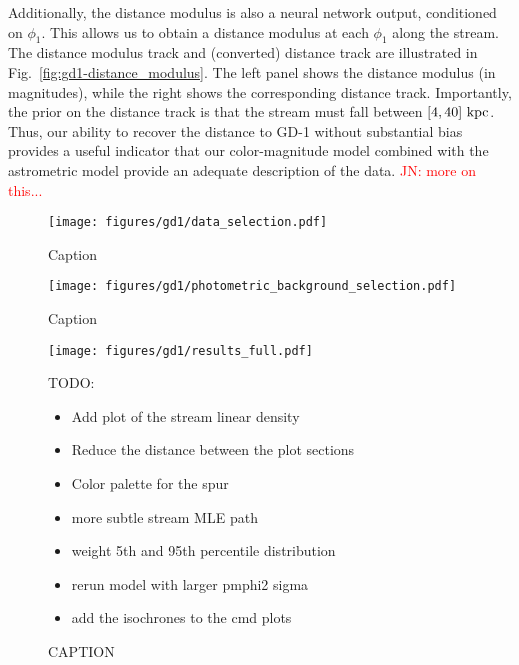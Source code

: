 \documentclass[twocolumn]{aastex631}
\newcommand{\JN}[1]{{\textcolor{red}{JN: #1}}}
\begin{document}
            Additionally, the distance modulus is also a neural network output, conditioned on $\phi_1$. This allows us to obtain a distance modulus at each $\phi_1$ along the stream. The distance modulus track and (converted) distance track are illustrated in Fig.~\ref{fig:gd1-distance_modulus}. The left panel shows the distance modulus (in magnitudes), while the right shows the corresponding distance track. Importantly, the prior on the distance track is that the stream must fall between $[4,40]~\rm{kpc}$. Thus, our ability to recover the distance to GD-1 without substantial bias provides a useful indicator that our color-magnitude model combined with the astrometric model provide an adequate description of the data. \JN{more on this...}

            \begin{figure*}[h]
                \centering
                \texttt{[image: figures/gd1/data\_selection.pdf]}
                \caption{Caption}
                \label{fig:gd1-data_selection}
            \end{figure*}

            \begin{figure}
                \centering
                \texttt{[image: figures/gd1/photometric\_background\_selection.pdf]}
                \caption{Caption}
                \label{fig:gd1-photometric_background_selection}
            \end{figure}

            \begin{figure*}[h]
                \centering
                \texttt{[image: figures/gd1/results\_full.pdf]}
                \caption{CAPTION}
                TODO:
                \begin{itemize}
                    \item Add plot of the stream linear density
                    \item Reduce the distance between the plot sections
                    \item Color palette for the spur
                    \item more subtle stream MLE path
                    \item weight 5th and 95th percentile distribution
                    \item rerun model with larger pmphi2 sigma
                    \item add the isochrones to the cmd plots
                \end{itemize}
                \label{fig:gd1-results-full}
            \end{figure*}
\end{document}

